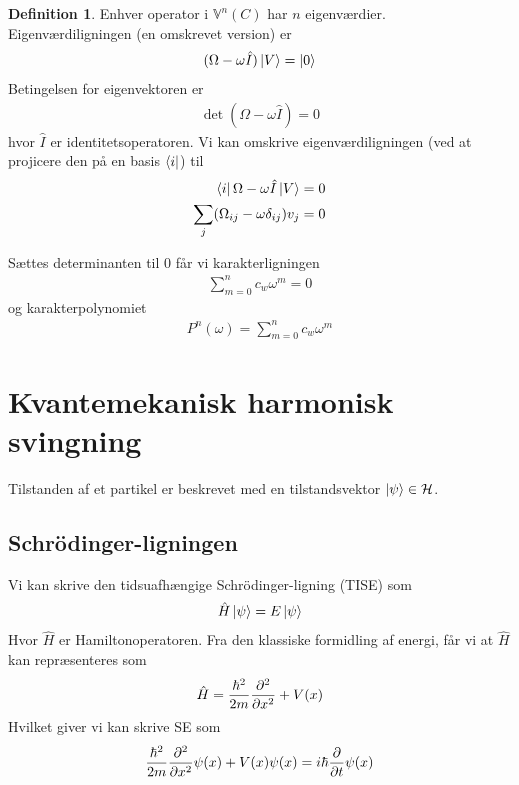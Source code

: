 \documentclass[12pt]{article}
\theoremstyle{definition}
\theoremstyle{remark}
\theoremstyle{definition}
\newtheorem{definition}{Definition}[section]
\newcounter{theo}[section]\setcounter{theo}{0}
\numberwithin{equation}{section}
\begin{document}
\begin{definition}
Enhver operator i $\mathbb V^n(C)$ har $n$
eigenværdier. Eigenværdiligningen (en omskrevet version) er
\begin{align}
  \label{eq:eigen}
  (\Omega - \omega \hat I)\ket V = \ket 0
\end{align}
Betingelsen for eigenvektoren er
\begin{align}
  \label{eq:kre}
  \det(\Omega-\omega \hat I) = 0
\end{align}
hvor $\hat I$ er identitetsoperatoren. Vi kan omskrive
eigenværdiligningen (ved at projicere den på en basis $\bra i$) til
\begin{align}
  \label{eq:eig2}
  \begin{split}
   \bra i \Omega - \omega\hat I \ket V = 0 \\
   \sum_j (\Omega_{ij}-\omega \delta_{ij})v_j = 0 
  \end{split}
\end{align}

Sættes determinanten til 0 får vi karakterligningen 
\begin{align}
  \label{eq:karklig}
  \sum_{m=0}^n c_w \omega^m = 0
\end{align}
og karakterpolynomiet
\begin{align}
  \label{eq:ei}
  P^n(\omega) = \sum_{m=0}^n c_w \omega^m
\end{align}
\end{definition}

\section{Kvantemekanisk harmonisk svingning}
Tilstanden af et partikel er beskrevet med en tilstandsvektor $\ket
\psi\in \mathcal H$.
\subsection{Schrödinger-ligningen}
Vi kan skrive den tidsuafhængige Schrödinger-ligning (TISE) som
\begin{align}
  \label{eq:schr}
  \hat H \ket \psi = E \ket \psi 
\end{align}
Hvor $\hat H$ er Hamiltonoperatoren. Fra den klassiske formidling af energi, får vi at $\hat H$ kan repræsenteres som
\begin{align*}
  \hat H = \frac{\hbar ^2}{2m} \pdv[2]{x}+V(x)
\end{align*}
Hvilket giver vi kan skrive SE som
\begin{align*}
  \frac{\hbar^2}{2m} \pdv[2]{x}\psi(x)+V(x)\psi(x) = i\hbar \pdv{t} \psi(x)
\end{align*}


\newpage
\printbibliography
\end{document}
